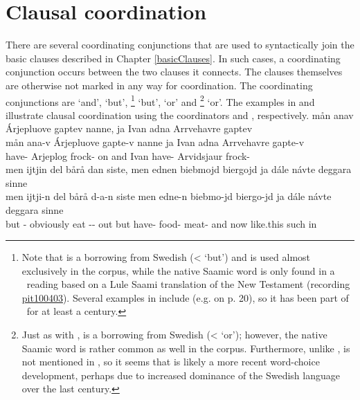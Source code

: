 \section{Clausal coordination}\label{clausalCoordination}
There are several coordinating conjunctions that are used to syntactically join the basic clauses described in Chapter \ref{basicClauses}. In such cases, a coordinating conjunction occurs between the two clauses it connects. The clauses themselves are otherwise not marked in any way for coordination. The coordinating conjunctions are  ‘and’,  ‘but’, \footnote{Note that  is a borrowing from Swedish (<  ‘but’) and is used almost exclusively in the corpus, while the native Saamic word  is only found in a \PS\ reading based on a Lule Saami translation of the New Testament (recording \hyperlink{pit100403}{pit100403}). Several examples in \citet{Lagercrantz1926} include  (e.g. on p. 20), so it has been part of \PS\ for at least a century.} 
‘but’,  ‘or’ and \footnote{Just as with ,  is a borrowing from Swedish (<  ‘or’); however, the native Saamic word  is rather common as well in the corpus. Furthermore, unlike ,  is not mentioned in \citet{Lagercrantz1926}, so it seems that  is likely a more recent word-choice development, perhaps due to increased dominance of the Swedish language over the last century.} 
‘or’. The examples in  and  illustrate clausal coordination using the coordinators  and , respectively.
\ea\label{coordination1}
\glll	mån anav Árjepluove gaptev nanne, ja Ivan adna Arrvehavre gaptev\\
	mån ana-v Árjepluove gapte-v nanne ja Ivan adna Arrvehavre gapte-v\\
	 have- Arjeplog\BS{} frock- on and Ivan have- Arvidsjaur\BS{} frock-\\\nopagebreak
{} 
\z
\ea\label{coordination2}
\glll	men ijtjin del bårå dan siste, men ednen biebmojd biergojd ja dále návte deggara sinne\\
	men ijtji-n del bårå d-a-n siste men edne-n biebmo-jd biergo-jd ja dále návte deggara sinne\\
	but - obviously eat\BS{} -- out but have- food- meat- and now like.this such\BS{} in\\\nopagebreak
{} 
\z

